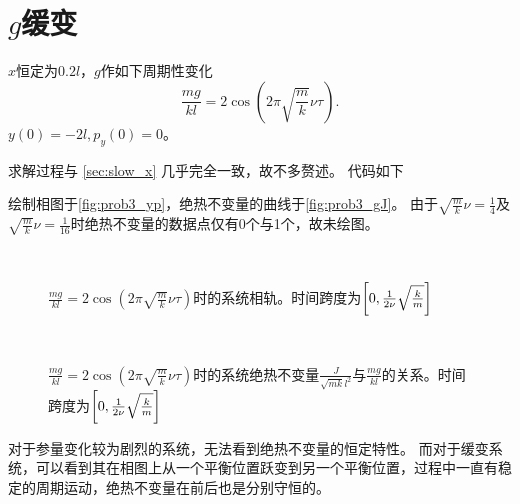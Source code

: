 \documentclass[a4paper,unicode]{report}
\begin{document}
\section{\texorpdfstring{$g$}{g}缓变}
$x$恒定为$0.2l$，$g$作如下周期性变化
\begin{equation}
    \frac{mg}{kl} = 2\cos(2\pi \sqrt{\frac{m}{k}}\nu\tau).
\end{equation}
$y(0) = -2l, p_y(0)=0$。

求解过程与 \autoref{sec:slow_x} 几乎完全一致，故不多赘述。
代码如下
{
    \linespread{1.0}
    
}

绘制相图于\autoref{fig:prob3_yp}，绝热不变量的曲线于\autoref{fig:prob3_gJ}。
由于$\sqrt{\frac{m}{k}}\nu=\frac{1}{4}$及$\sqrt{\frac{m}{k}}\nu=\frac{1}{16}$时绝热不变量的数据点仅有0个与1个，故未绘图。

\begin{figure}
    \centering
    \\
    \caption{$\frac{mg}{kl} = 2\cos(2\pi \sqrt{\frac{m}{k}}\nu\tau)$时的系统相轨。时间跨度为$\qty[0, \frac{1}{2\nu}\sqrt{\frac{k}{m}}]$}
    \label{fig:prob3_yp}
\end{figure}

\begin{figure}
    \centering
    \\
    \caption{$\frac{mg}{kl} = 2\cos(2\pi \sqrt{\frac{m}{k}}\nu\tau)$时的系统绝热不变量$\frac{J}{\sqrt{mk}l^2}$与$\frac{mg}{kl}$的关系。时间跨度为$\qty[0, \frac{1}{2\nu}\sqrt{\frac{k}{m}}]$}
    \label{fig:prob3_gJ}
\end{figure}

对于参量变化较为剧烈的系统，无法看到绝热不变量的恒定特性。
而对于缓变系统，可以看到其在相图上从一个平衡位置跃变到另一个平衡位置，过程中一直有稳定的周期运动，绝热不变量在前后也是分别守恒的。
\end{document}
